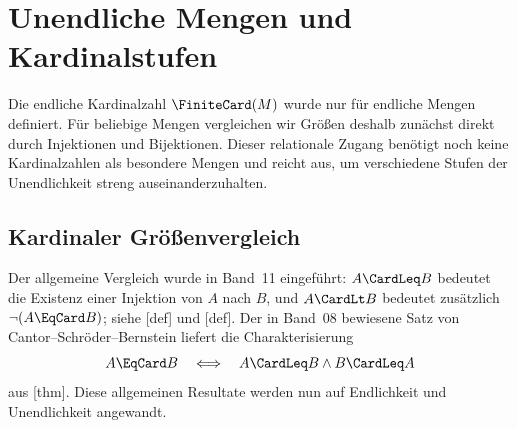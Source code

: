 \documentclass[main.tex]{subfiles}
\begin{document}
\begin{tabproofsplit}
  \proofpart{\(\vdash\)}
  \closeproofpart

  \proofpart{\(\dashv\)}
  \closeproofpart
\end{tabproofsplit}


\chapter{Unendliche Mengen und Kardinalstufen}

\let\proofstepwidestar\proofstepwidestarbreak

Die endliche Kardinalzahl \(\FiniteCard(M)\) wurde nur für endliche Mengen
definiert. Für beliebige Mengen vergleichen wir Größen deshalb zunächst
direkt durch Injektionen und Bijektionen. Dieser relationale Zugang benötigt
noch keine Kardinalzahlen als besondere Mengen und reicht aus, um
verschiedene Stufen der Unendlichkeit streng auseinanderzuhalten.

\section{Kardinaler Größenvergleich}

Der allgemeine Vergleich wurde in Band~11 eingeführt: \(A\CardLeq B\)
bedeutet die Existenz einer Injektion von \(A\) nach \(B\), und
\(A\CardLt B\) bedeutet zusätzlich \(\neg(A\EqCard B)\);
siehe [def] und
[def]. Der in Band~08 bewiesene Satz von
Cantor--Schröder--Bernstein liefert die Charakterisierung
\[
  A\EqCard B\quad\Longleftrightarrow\quad
  A\CardLeq B\land B\CardLeq A
\]
aus [thm]. Diese allgemeinen
Resultate werden nun auf Endlichkeit und Unendlichkeit angewandt.
\end{document}
